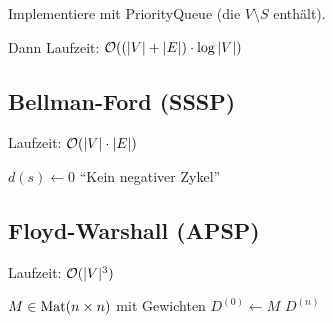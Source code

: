 Implementiere mit PriorityQueue (die $V \setminus S$ enthält).

Dann Laufzeit: $\mathcal{O}((|V|+|E|)\cdot\log|V|)$

\subsection*{Bellman-Ford (SSSP)}
Laufzeit: $\mathcal{O}(|V|\cdot|E|)$

\begin{algorithm}[H]
	$d(s) \gets 0$\;
	\KwRet \enquote{Kein negativer Zykel}\;
\end{algorithm}

\subsection*{Floyd-Warshall (APSP)}
Laufzeit: $\mathcal{O}(|V|^3)$

\begin{algorithm}[H]
	$M \in \operatorname{Mat}(n\times n)$ mit Gewichten\;
	$D^{(0)} \gets M$\;
	\KwRet $D^{(n)}$\;
\end{algorithm}
